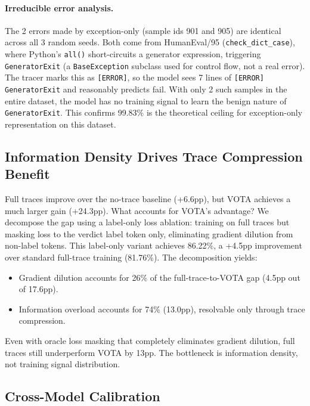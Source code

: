 \documentclass[11pt]{article}
\begin{document}
\paragraph{Irreducible error analysis.}
The 2 errors made by exception-only (sample ids 901 and 905) are identical across all 3 random seeds. Both come from HumanEval/95 (\texttt{check\_dict\_case}), where Python's \texttt{all()} short-circuits a generator expression, triggering \texttt{GeneratorExit} (a \texttt{BaseException} subclass used for control flow, not a real error). The tracer marks this as \texttt{[ERROR]}, so the model sees 7 lines of \texttt{[ERROR] GeneratorExit} and reasonably predicts fail. With only 2 such samples in the entire dataset, the model has no training signal to learn the benign nature of \texttt{GeneratorExit}. This confirms 99.83\% is the theoretical ceiling for exception-only representation on this dataset.

\subsection{Information Density Drives Trace Compression Benefit}
\label{sec:exp-density}

Full traces improve over the no-trace baseline (+6.6pp), but VOTA achieves a much larger gain (+24.3pp). What accounts for VOTA's advantage? We decompose the gap using a label-only loss ablation: training on full traces but masking loss to the verdict label token only, eliminating gradient dilution from non-label tokens. This label-only variant achieves 86.22\%, a +4.5pp improvement over standard full-trace training (81.76\%). The decomposition yields:

\begin{itemize}[nosep,leftmargin=*]
    \item Gradient dilution accounts for 26\% of the full-trace-to-VOTA gap (4.5pp out of 17.6pp).
    \item Information overload accounts for 74\% (13.0pp), resolvable only through trace compression.
\end{itemize}

Even with oracle loss masking that completely eliminates gradient dilution, full traces still underperform VOTA by 13pp. The bottleneck is information density, not training signal distribution.

\subsection{Cross-Model Calibration}
\label{sec:exp-calibration}
\end{document}
